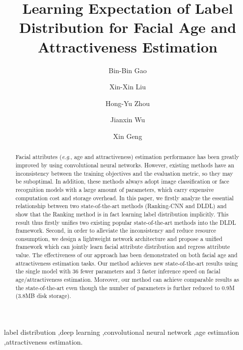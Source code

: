 \documentclass[5p,times,twocolumn]{elsarticle}
\makeatletter
\DeclareRobustCommand\onedot{\@onedot}
\def\@onedot{.}
\def\eg{\emph{e.g}\onedot}
\makeatother
\begin{document}
\begin{frontmatter}

\title{Learning Expectation of Label Distribution for Facial Age and Attractiveness Estimation}

\author[youtu]{Bin-Bin Gao}

\author[nju]{Xin-Xin Liu}

\author[youtu]{Hong-Yu Zhou}

\author[nju]{Jianxin Wu}

\author[esu]{Xin Geng}

\address[youtu]{YouTu Lab, Tencent, Shenzhen 518075, China}
\address[nju]{National Key Laboratory for Novel Software Technology, Nanjing University, Nanjing 210023, China.}
\address[esu]{MOE Key Laboratory of Computer Network and Information Integration, Southeast University, Nanjing 211189, China}


\begin{abstract}
Facial attributes (\eg, age and attractiveness) estimation performance has been greatly improved by using convolutional neural networks. However, existing methods have an inconsistency between the training objectives and the evaluation metric, so they may be suboptimal. In addition, these methods always adopt image classification or face recognition models with a large amount of parameters, which carry expensive computation cost and storage overhead. In this paper, we firstly analyze the essential relationship between two state-of-the-art methods (Ranking-CNN and DLDL) and show that the Ranking method is in fact learning label distribution implicitly. This result thus firstly unifies two existing popular state-of-the-art methods into the DLDL framework. Second, in order to alleviate the inconsistency and reduce resource consumption, we design a lightweight network architecture and propose a unified framework which can jointly learn facial attribute distribution and regress attribute value. The effectiveness of our approach has been demonstrated on both facial age and attractiveness estimation tasks. Our method achieves new state-of-the-art results using the single model with 36 fewer parameters and 3 faster inference speed on facial age/attractiveness estimation. Moreover, our method can achieve comparable results as the state-of-the-art even though the number of parameters is further reduced to 0.9M (3.8MB disk storage).
\end{abstract}

\begin{keyword}
label distribution \sep deep learning \sep convolutional neural network \sep age estimation \sep attractiveness estimation.
\end{keyword}

\end{frontmatter}
\end{document}
